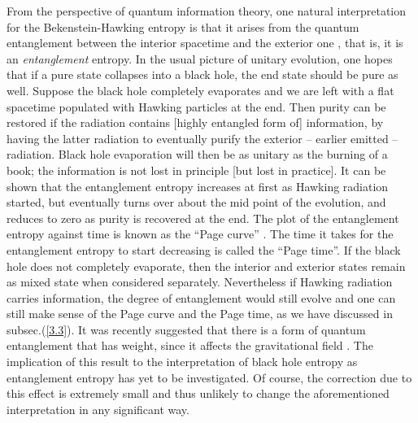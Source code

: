 \documentclass[12pt]{article}
\newcommand{\2}{$^2$}
\newcommand{\3}{$^3$}
\newcommand{\4}{$_4$}
\newcommand{\5}{$_5$}
\begin{document}
From the perspective of quantum information theory, one natural interpretation for the Bekenstein-Hawking entropy is that it arises from the quantum entanglement between the interior spacetime and the exterior one \cite{9404039}, that is, it is an \emph{entanglement} entropy. In the usual picture of unitary evolution, one hopes that if a pure state collapses into a black hole, the end state should be pure as well. 
Suppose the black hole completely evaporates and we are left with a flat spacetime populated with Hawking particles at the end. Then purity can be restored if the radiation contains [highly entangled form of] information, by having the latter radiation to eventually purify the exterior -- earlier emitted -- radiation. Black hole evaporation will then be as unitary as the burning of a book; the information is not lost in principle [but lost in practice]. It can be shown that the entanglement entropy increases at first as Hawking radiation started, but eventually turns over about the mid point of the evolution, and reduces to zero as purity is recovered at the end. The plot of the entanglement entropy against time is known as the ``Page curve'' \cite{page1, page2}. The time it takes for the entanglement entropy to start decreasing is called the ``Page time''. If the black hole does not completely evaporate, then the interior and exterior states remain as mixed state when considered separately. Nevertheless if Hawking radiation carries information, the degree of entanglement would still evolve and one can still make sense of the Page curve and the Page time, as we have discussed in subsec.(\ref{3.3}). It was recently suggested that there is a form of quantum entanglement that has weight, since it affects the gravitational field \cite{DEB}. The implication of this result to the interpretation of black hole entropy as entanglement entropy has yet to be investigated. Of course, the correction due to this effect is extremely small and thus unlikely to change the aforementioned interpretation in any significant way. 
\end{document}
